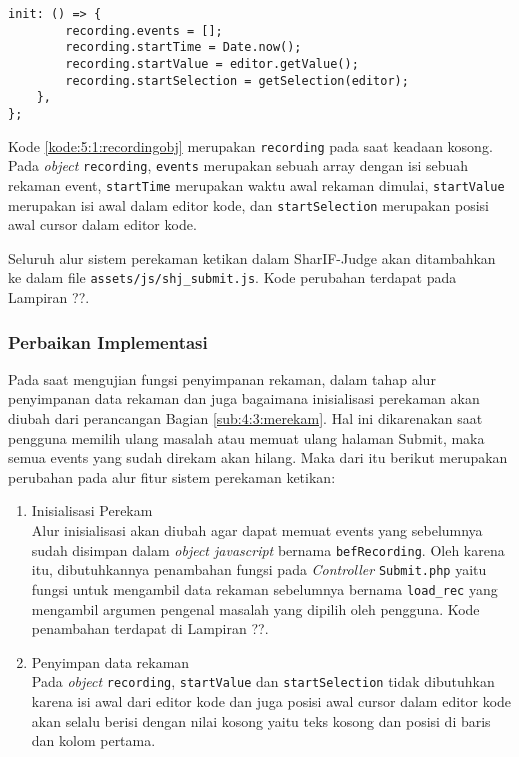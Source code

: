 \begin{enumerate}
\begin{lstlisting}[caption={Contoh argumen yang diberikan oleh fungsi onchange}, label={kode:5:1:recordingobj}]
    init: () => {
        recording.events = [];
        recording.startTime = Date.now();
        recording.startValue = editor.getValue();
        recording.startSelection = getSelection(editor);
    },
};
    \end{lstlisting}

    Kode \ref{kode:5:1:recordingobj} merupakan \verb|recording| pada saat keadaan kosong. Pada \textit{object} \verb|recording|, \verb|events| merupakan sebuah array dengan isi sebuah rekaman event, \verb|startTime| merupakan waktu awal rekaman dimulai, \verb|startValue| merupakan isi awal dalam editor kode, dan \verb|startSelection| merupakan posisi awal cursor dalam editor kode.
\end{enumerate}

Seluruh alur sistem perekaman ketikan dalam SharIF-Judge akan ditambahkan ke dalam file \verb|assets/js/|\verb|shj_submit.js|. Kode perubahan terdapat pada Lampiran ??.

\subsubsection{Perbaikan Implementasi}

Pada saat mengujian fungsi penyimpanan rekaman, dalam tahap alur penyimpanan data rekaman dan juga bagaimana inisialisasi perekaman akan diubah dari perancangan Bagian \ref{sub:4:3:merekam}. Hal ini dikarenakan saat pengguna memilih ulang masalah atau memuat ulang halaman Submit, maka semua events yang sudah direkam akan hilang. Maka dari itu berikut merupakan perubahan pada alur fitur sistem perekaman ketikan:

\begin{enumerate}
    \item Inisialisasi Perekam \\
    Alur inisialisasi akan diubah agar dapat memuat events yang sebelumnya sudah disimpan dalam \textit{object javascript} bernama \verb|befRecording|. Oleh karena itu, dibutuhkannya penambahan fungsi pada \textit{Controller} \verb|Submit.php| yaitu fungsi untuk mengambil data rekaman sebelumnya bernama \verb|load_rec| yang mengambil argumen pengenal masalah yang dipilih oleh pengguna. Kode penambahan terdapat di Lampiran ??.
    \item Penyimpan data rekaman \\
    Pada \textit{object} \verb|recording|, \verb|startValue| dan \verb|startSelection| tidak dibutuhkan karena isi awal dari editor kode dan juga posisi awal cursor dalam editor kode akan selalu berisi dengan nilai kosong yaitu teks kosong dan posisi di baris dan kolom pertama.
\end{enumerate}

